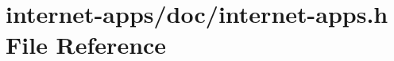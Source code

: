 \hypertarget{internet-apps_8h}{}\section{internet-\/apps/doc/internet-\/apps.h File Reference}
\label{internet-apps_8h}
